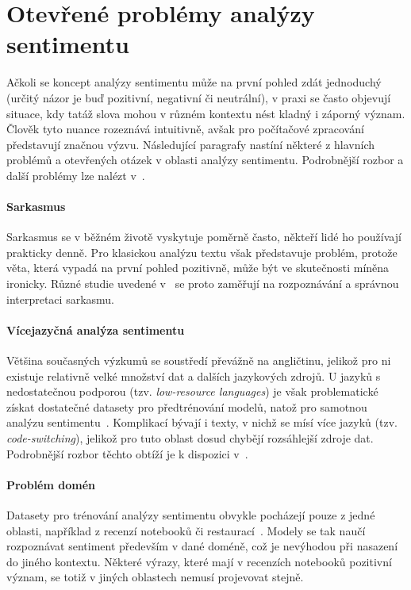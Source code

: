 \section{Otevřené problémy analýzy sentimentu}
Ačkoli se koncept analýzy sentimentu může na první pohled zdát jednoduchý (určitý názor je buď pozitivní, negativní či neutrální), v praxi se často objevují situace, kdy tatáž slova mohou v různém kontextu nést kladný i záporný význam. Člověk tyto nuance rozeznává intuitivně, avšak pro počítačové zpracování představují značnou výzvu. Následující paragrafy nastíní některé z hlavních problémů a otevřených otázek v oblasti analýzy sentimentu. Podrobnější rozbor a další problémy lze nalézt v~\cite{kumar2023comprehensivereviewsentimentanalysis, MAO2024102048, BIRJALI2021107134}.

\paragraph{Sarkasmus}
Sarkasmus se v běžném životě vyskytuje poměrně často, někteří lidé ho používají prakticky denně. Pro klasickou analýzu textu však představuje problém, protože věta, která vypadá na první pohled pozitivně, může být ve skutečnosti míněna ironicky. Různé studie uvedené v~\cite{BIRJALI2021107134} se proto zaměřují na rozpoznávání a správnou interpretaci sarkasmu.

\paragraph{Vícejazyčná analýza sentimentu}
Většina současných výzkumů se soustředí převážně na angličtinu, jelikož pro ni existuje relativně velké množství dat a dalších jazykových zdrojů. U jazyků s nedostatečnou podporou (tzv. \emph{low-resource languages}) je však problematické získat dostatečné datasety pro předtrénování modelů, natož pro samotnou analýzu sentimentu~\cite{BIRJALI2021107134}. Komplikací bývají i texty, v nichž se mísí více jazyků (tzv. \emph{code-switching}), jelikož pro tuto oblast dosud chybějí rozsáhlejší zdroje dat. Podrobnější rozbor těchto obtíží je k dispozici v~\cite{kumar2023comprehensivereviewsentimentanalysis, MAO2024102048, BIRJALI2021107134}.

\paragraph{Problém domén}
Datasety pro trénování analýzy sentimentu obvykle pocházejí pouze z jedné oblasti, například z recenzí notebooků či restaurací~\cite{pontiki-etal-2014-semeval}. Modely se tak naučí rozpoznávat sentiment především v dané doméně, což je nevýhodou při nasazení do jiného kontextu. Některé výrazy, které mají v recenzích notebooků pozitivní význam, se totiž v jiných oblastech nemusí projevovat stejně.~\cite{kumar2023comprehensivereviewsentimentanalysis, MAO2024102048, BIRJALI2021107134}
